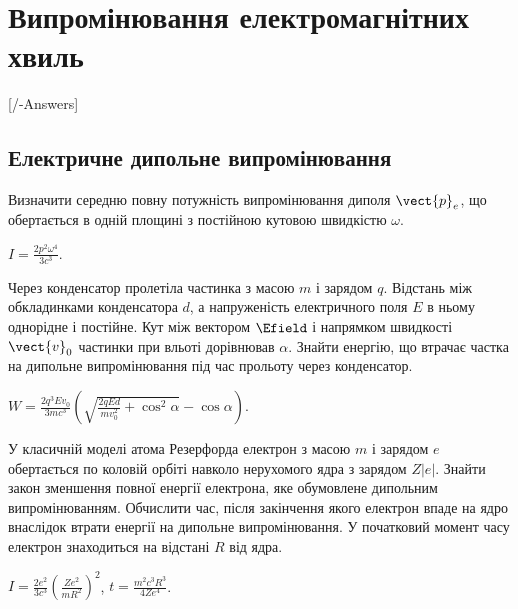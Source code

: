 
\chapter{Випромінювання електромагнітних хвиль}\label{\currfilebase}
[\currfilebase/\currfilebase-Answers]
%

\section{Електричне дипольне випромінювання}

%
%
%


\begin{problem}
Визначити середню повну потужність випромінювання диполя $\vect{p}_e$, що обертається в одній площині з постійною кутовою швидкістю $\omega$.
\begin{solution}
	$I = \frac{2p^2\omega^4}{3c^3}$.
\end{solution}
\end{problem}


\begin{problem}
Через конденсатор пролетіла частинка з масою $ m $ і зарядом $ q $. Відстань між обкладинками конденсатора $ d $, а напруженість електричного поля $ E $ в ньому однорідне і постійне.
Кут між вектором $ \Efield $ і напрямком швидкості $ \vect{v}_0 $ частинки при вльоті дорівнював $ \alpha $. Знайти енергію, що втрачає частка на дипольне випромінювання під час прольоту через конденсатор.
\begin{solution}
	$W = \frac{2q^3Ev_0}{3mc^3}\left( \sqrt{\frac{2qEd}{mv_0^2}+\cos^2\alpha} - \cos\alpha\right) $.
\end{solution}
\end{problem}

\begin{problem}
У класичній моделі атома Резерфорда електрон з масою $m$ і зарядом $e$ обертається по коловій орбіті навколо нерухомого ядра з зарядом $Z|e|$. Знайти закон зменшення повної енергії електрона, яке обумовлене дипольним випромінюванням. Обчислити час, після закінчення якого електрон впаде на ядро внаслідок втрати енергії на дипольне випромінювання. У початковий момент часу електрон знаходиться на відстані $R$ від ядра.
\begin{solution}
	$I = \frac{2e^2}{3c^3} \left( \frac{Ze^2}{mR^2}\right)^2 $, $t = \frac{m^2c^3R^3}{4Ze^4}$.
\end{solution}
\end{problem}

